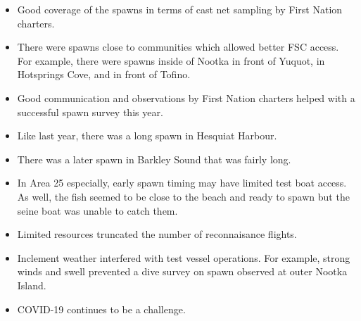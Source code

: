\begin{itemize}

\item Good coverage of the spawns in terms of cast net sampling by First Nation charters.

\item There were spawns close to communities which allowed better FSC access.
For example, there were spawns inside of Nootka in front of Yuquot,
in Hotsprings Cove, and in front of Tofino.

\item Good communication and observations by First Nation charters
helped with a successful spawn survey this year.

\item Like last year, there was a long spawn in Hesquiat Harbour.

\item There was a later spawn in Barkley Sound that was fairly long.

\item In Area 25 especially, early spawn timing may have limited test boat access.
As well, the fish seemed to be close to the beach and ready to spawn but
the seine boat was unable to catch them.

\item Limited resources truncated the number of reconnaisance flights.

\item Inclement weather interfered with test vessel operations.
For example, strong winds and swell prevented a dive survey
on spawn observed at outer Nootka Island.

\item COVID-19 continues to be a challenge.

\end{itemize}

